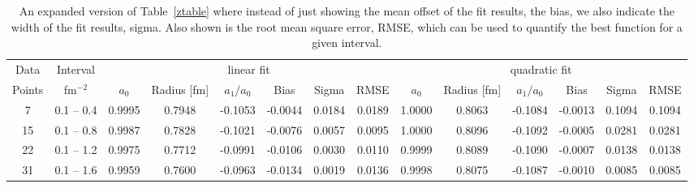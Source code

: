 \documentclass[10pt,aps,prc,twocolumn]{revtex4-1}
\begin{document}
\begin{table}
\caption{An expanded version of Table~\ref{ztable} where instead of just showing the mean offset of the 
fit results, the bias, we also indicate the width of the fit results, sigma.   Also shown is the
root mean square error, RMSE, which can be used to quantify the best function for a given interval.}
\begin{tabular}{cc|cccccc|cccccc} \hline
Data   & Interval     & \multicolumn{6}{c|}{linear fit}                       & \multicolumn{6}{c}{quadratic fit}                    \\ 
Points & fm$^{-2}$ &   $a_0$  & Radius [fm]&  $a_1/a_0$ &  Bias  & Sigma &  RMSE  &   $a_0$  & Radius [fm]& $a_1/a_0$  &  Bias  & Sigma &  RMSE \\  \hline
7      & 0.1 -- 0.4 & 0.9995& 0.7948& -0.1053& -0.0044& 0.0184& 0.0189 & 1.0000& 0.8063& -0.1084& -0.0013& 0.1094& 0.1094\\
15     & 0.1 -- 0.8 & 0.9987& 0.7828& -0.1021& -0.0076& 0.0057& 0.0095 & 1.0000& 0.8096& -0.1092& -0.0005& 0.0281& 0.0281\\
22     & 0.1 -- 1.2 & 0.9975& 0.7712& -0.0991& -0.0106& 0.0030& 0.0110 & 0.9999& 0.8089& -0.1090& -0.0007& 0.0138& 0.0138\\
31     & 0.1 -- 1.6 & 0.9959& 0.7600& -0.0963& -0.0134& 0.0019& 0.0136 & 0.9998& 0.8075& -0.1087& -0.0010& 0.0085& 0.0085\\ \hline
\end{tabular}
\label{fulltable}
\end{table}
\end{document}
